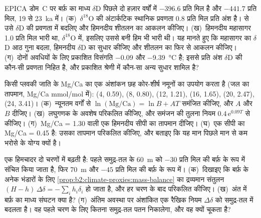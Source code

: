 \begin{exercise}[$\star\star\star$]\label{exo:b2:climate-proxies:10}
EPICA डोम~C पर बर्फ़ का माध्य $\delta$D पिछले दो हज़ार वर्षों में $-396.6$ प्रति मिल है
और $-441.7$ प्रति मिल, 19 से \qty{23}{ka} में। (क)~$\delta^{18}$O की अंटार्कटिक स्थानिक प्रवणता
\num{0.8} प्रति मिल प्रति अंश है।  से उसे $\delta$D की प्रवणता में बदलिए और
हिमनदीय शीतलन का आकलन कीजिए। (ख)~हिमनदीय महासागर \num{1.0} प्रति मिल भारी था,
$\delta^{18}$O में, इसलिए उससे बनी हिम भी भारी थी। यह मानते हुए कि महासागर का $\delta$D
आठ गुना बदला, हिमनदीय $\delta$D का सुधार कीजिए और शीतलन का फिर से आकलन कीजिए।
(ग)~दोनों अवधियों के लिए प्रकाशित विसंगति $-0.09$ और \qty{-9.39}{\celsius} है; इससे प्रति अंश $\delta$D की
कौन-सी प्रवणता निहित है, और प्रकाशित श्रेणी में कौन-सा अन्य सुधार शामिल है?
\end{exercise}

\begin{exercise}[$\star\star\star$]\label{exo:b2:climate-proxies:11}
किसी प्लवकी जाति के Mg/Ca का एक अंशांकन छह कोर-शीर्ष नमूनों का उपयोग करता है (जल का तापमान,
Mg/Ca \unit{mmol/mol} में): (4, 0.59), (8, 0.80), (12, 1.21), (16, 1.65), (20, 2.47), (24, 3.41)।
(क)~न्यूनतम वर्गों से $\ln(\text{Mg/Ca}) = \ln B + AT$ समंजित कीजिए, और $A$ और $B$ दीजिए। (ख)~लघुगणक के
अवशेष परिकलित कीजिए, और समंजन की तुलना नियम $0.4\,\mathrm{e}^{0.09T}$ से कीजिए। (ग)~Mg/Ca = 1.30 वाली
एक हिमनदीय सीपी का तापमान दीजिए। (घ)~एक सीपी का Mg/Ca = 0.45 है: उसका
तापमान परिकलित कीजिए, और बताइए कि यह मान पिछले मान से कम भरोसे के योग्य क्यों है।
\end{exercise}

\begin{exercise}[$\star\star\star$]\label{exo:b2:climate-proxies:12}
एक हिमचादर दो चरणों में बढ़ती है: पहले समुद्र-तल के \qty{60}{m} को $-30$ प्रति मिल की बर्फ़ के रूप में संचित किया जाता है,
फिर \qty{70}{m} और $-45$ प्रति मिल की बर्फ़ के रूप में। (क)~दिखाइए कि बर्फ़ के अनेक भंडारों के लिए
\cref{prop:b2:climate-proxies:mass-balance} का द्रव्यमान संतुलन $(H - h)\,\Delta\delta = -\sum_i h_i\delta_i$
हो जाता है, और हर चरण के बाद  परिकलित कीजिए। (ख)~अंत में बर्फ़ का माध्य
संघटन क्या है? (ग)~अंतिम अवस्था पर अंशांकित एक रैखिक नियम
$\Delta\delta$ को समुद्र-तल में बदलता है। वह पहले चरण के लिए कितना समुद्र-तल पतन निकालेगा, और वह
क्यों चूकता है?
\end{exercise}

